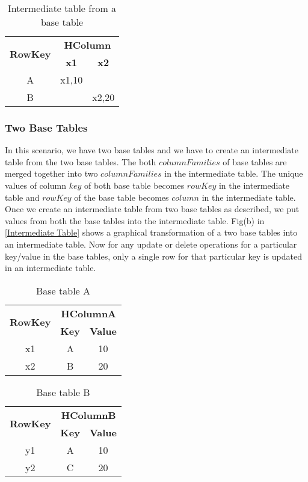 \documentclass[11pt,a4paper,bibtotoc,idxtotoc,headsepline,footsepline,footexclude,BCOR12mm,DIV13]{scrbook}
\begin{document}
\begin{table*}[htb!]
	\centering
	\begin{tabular}{|c|c|c|}
		\hline
		\multirow{2}{*}{\textbf{RowKey}} & \multicolumn{2}{c|}{\textbf{HColumn}}\\
		\cline{2-3}
		& \textbf{x1} & \textbf{x2}\\
		\hline
		A & x1,10 & \\
		\hline
		B &  & x2,20\\
		
		\hline
	\end{tabular}
	\caption{Intermediate table from a base table}
	\label{HBase:IntermediateTable}
\end{table*}

\subsubsection{Two Base Tables}
\label{Two Base Tables}
In this scenario, we have two base tables and we have to create an intermediate table from the two base tables. The both $columnFamilies$ of base tables are merged together into two $columnFamilies$ in the intermediate table. The unique values of column $key$ of both base table becomes $rowKey$ in the intermediate table and $rowKey$ of the base table becomes $column$ in the intermediate table. Once we create an intermediate table from two base tables as described, we put values from both the base tables into the intermediate table. Fig(b) in \ref{Intermediate Table} shows a graphical transformation of a two base tables into an intermediate table. Now for any update or delete operations for a particular key/value in the base tables, only a single row for that particular key is updated in an intermediate table.

\begin{table*}[htb!]
	\centering
	\begin{tabular}{|c|c|c|}
		\hline
		\multirow{2}{*}{\textbf{RowKey}} & \multicolumn{2}{c|}{\textbf{HColumnA}}\\
		\cline{2-3}
		& \textbf{Key} & \textbf{Value}\\
		\hline
		x1 & A & 10\\
		\hline
		x2 & B & 20\\
		
		\hline
	\end{tabular}
	\caption{Base table A}
	\label{table:BaseTable1}
\end{table*}

\begin{table*}[htb!]
	\centering
	\begin{tabular}{|c|c|c|}
		\hline
		\multirow{2}{*}{\textbf{RowKey}} & \multicolumn{2}{c|}{\textbf{HColumnB}}\\
		\cline{2-3}
		& \textbf{Key} & \textbf{Value}\\
		\hline
		y1 & A & 10\\
		\hline
		y2 & C & 20\\
		
		\hline
	\end{tabular}
	\caption{Base table B}
	\label{table:BaseTable2}
\end{table*}
\end{document}
